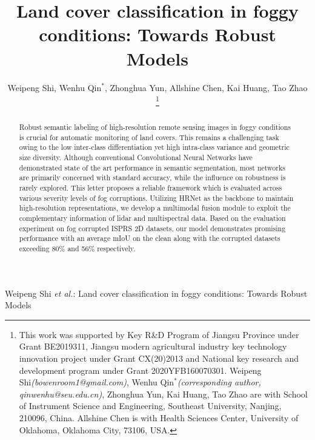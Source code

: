 \documentclass[lettersize,journal]{IEEEtran}
\begin{document}
\title{Land cover classification in foggy conditions: Towards Robust Models}

\author{Weipeng Shi, Wenhu Qin$^{*}$, Zhonghua Yun, Allshine Chen, Kai Huang, Tao Zhao
\thanks{This work was supported by Key R\&D Program of Jiangsu Province under Grant BE2019311, Jiangsu modern agricultural industry key technology innovation project under Grant CX(20)2013 and
National key research and development program under Grant 
2020YFB160070301. Weipeng Shi\emph{(bowenroom1@gmail.com)}, Wenhu Qin$^{*}$\emph{(corresponding author, qinwenhu@seu.edu.cn)}, Zhonghua Yun, Kai Huang, Tao Zhao are with School of Instrument Science and Engineering, Southeast University, Nanjing, 210096, China. Allshine Chen is with Health Sciences Center, University of Oklahoma, Oklahoma City, 73106, USA.}%
}

%
{Weipeng Shi \MakeLowercase{\textit{et al.}}: Land cover classification in foggy conditions: Towards Robust Models}


\maketitle

\begin{abstract}
Robust semantic labeling of high-resolution remote sensing images in foggy conditions is crucial for automatic monitoring of land covers. This remains a challenging task owing to the low inter-class differentiation yet high intra-class variance and geometric size diversity. Although conventional Convolutional Neural Networks have demonstrated state of the art performance in semantic segmentation, most networks are primarily concerned with standard accuracy, while the influence on robustness is rarely explored. This letter proposes a reliable framework which is evaluated across various severity levels of fog corruptions. Utilizing HRNet as the backbone to maintain high-resolution representations, we develop a multimodal fusion module to exploit the complementary information of lidar and multispectral data. Based on the evaluation experiment on fog corrupted ISPRS 2D datasets, our model demonstrates promising performance with  an average mIoU on the clean along with the corrupted datasets exceeding 80\% and 56\% respectively.

\end{abstract}
\end{document}
